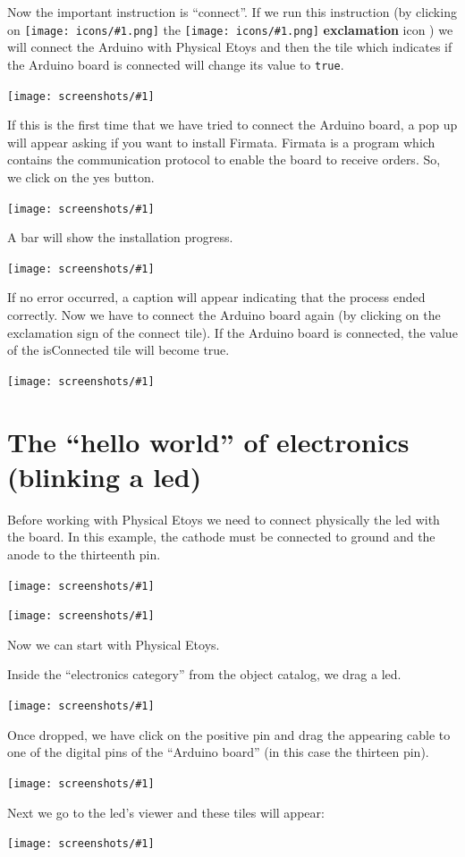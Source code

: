 \documentclass[a4paper,12pt]{article}
\newcommand{\screenshot}[1]
{
\begin{center}
	\texttt{[image: screenshots/\#1]}
\end{center}
}
\newcommand{\code}[1]{\texttt{#1}}
\newcommand{\important}[1]{\textbf{#1}}
\newcommand{\inserticon}[1]
{
\texttt{[image: icons/\#1.png]}
}
\newcommand{\icon}[2][]
{
\ifthenelse {\equal{#1} {}} {\inserticon{#2}} {the \inserticon{#2} \important{#1} icon}
}
\begin{document}
Now the important instruction is “connect”. If we run this instruction (by
clicking on \icon[exclamation]{exclamation}) we will connect the Arduino with
Physical Etoys and then the tile which indicates if the Arduino board is
connected will change its value to \code{true}. 

\screenshot{10.png}

If this is the first time that we have tried to connect the Arduino board, a
pop up will appear asking if you want to install Firmata. Firmata is a program
which contains the communication protocol to enable the board to receive
orders. So, we click on the yes button. 

\screenshot{11.png}


A bar will show the installation progress.
 
\screenshot{12.png}

If no error occurred, a caption will appear indicating that the process ended
correctly. Now we have to connect the Arduino board again (by clicking on the
exclamation sign of the connect tile). If the Arduino board is connected, the
value of the isConnected tile will become true. 

\screenshot{13.png}

\section{The “hello world” of electronics (blinking a led)}

Before working with Physical Etoys we need to connect physically the led with
the board. In this example, the cathode must be connected to ground and the
anode to the thirteenth pin. 

\screenshot{14.jpg}

\screenshot{15.png}

Now we can start with Physical Etoys. 

Inside the “electronics category” from the object catalog, we drag a led. 

\screenshot{16.png}

Once dropped, we have click on the positive pin and drag the appearing cable to
one of the digital pins of the “Arduino board” (in this case the thirteen pin). 

\screenshot{17.png}

Next we go to the led’s viewer and these tiles will appear:

\screenshot{18.png}
\end{document}
